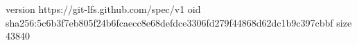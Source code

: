 version https://git-lfs.github.com/spec/v1
oid sha256:5c6b3f7eb805f24b6fcaecc8e68defdce3306fd279f44868d62dc1b9c397cbbf
size 43840
